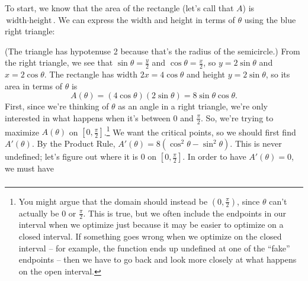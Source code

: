 \documentclass[main]{subfiles}
\begin{document}
\begin{enumerate}
\begin{solution}
    To start, we know that the area of the rectangle (let's call that $A$)
    is $\text{width} \cdot \text{height}$.  We can express the width and
    height in terms of $\theta$ using the blue right triangle:
    \begin{center}
    \end{center}
    (The triangle has hypotenuse 2 because that's the radius of the
    semicircle.)  From the right triangle, we see that $\sin \theta =
    \frac{y}{2}$ and $\cos \theta = \frac{x}{2}$, so $y = 2 \sin \theta$
    and $x = 2 \cos \theta$.  The rectangle has width $2x = 4 \cos \theta$
    and height $y = 2 \sin \theta$, so its area in terms of $\theta$ is
    \[ A(\theta) = (4 \cos \theta)(2 \sin \theta) = 8 \sin \theta \cos
    \theta.\]  First, since we're thinking of
    $\theta$ as an angle in a right triangle, we're only interested in
    what happens when it's between $0$ and $\frac{\pi}{2}$.  So, we're
    trying to maximize $A(\theta)$ on $\left[0, \frac{\pi}{2}
    \right]$.\footnote{You might argue that the domain should instead be
      $\left( 0, \frac{\pi}{2} \right)$, since $\theta$ can't actually be
      $0$ or $\frac{\pi}{2}$.  This is true, but we often include the
      endpoints in our interval when we optimize just because it may be
      easier to optimize on a closed interval.  If something goes wrong
      when we optimize on the closed interval -- for example, the function
      ends up undefined at one of the ``fake'' endpoints -- then we have
      to go back and look more closely at what happens on the open
      interval.}  We want the critical points, so we should first find
    $A'(\theta)$.  By the Product Rule, $A'(\theta) = 8 (\cos^2 \theta -
    \sin^2 \theta)$.  This is never undefined; let's figure out where it
    is 0 on $\left[ 0, \frac{\pi}{2} \right]$.  In order to have
    $A'(\theta) = 0$, we must have
    \begin{align*}

\end{align*}
\end{solution}
\end{enumerate}
\end{document}

